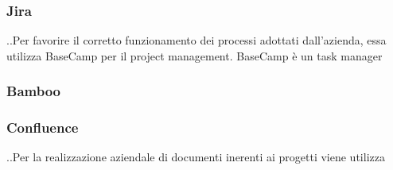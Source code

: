\subsubsection{Jira}
..Per favorire il corretto funzionamento dei processi adottati dall’azienda, essa
utilizza BaseCamp per il project management. BaseCamp è un task manager
\subsubsection{Bamboo}
\subsubsection{Confluence}
..Per la realizzazione aziendale di documenti inerenti ai progetti viene utilizza


